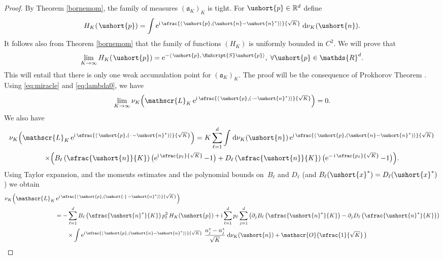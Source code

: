 \documentclass[10pt]{amsart}
\newcommand{\scaleto}[2]{#1}
\let\mathcal\mathscr
\numberwithin{equation}{section}
\theoremstyle{plain}
\theoremstyle{definition}
\newcommand{\real}{\mathbb{R}}
\newcommand{\sK}{K}
\newcommand{\gen}{\mathscr{L}_{\sK}}
\newcommand{\vecn}{\ushort{n}}
\newcommand{\vecnf}{\ushort{n}^*}
\newcommand{\svecnf}{\ushort{n}^*}
\newcommand{\vecxf}{\ushort{x}^*}
\newcommand{\vp}{\ushort{p}}
\newcommand{\nuk}{\nu_{K}}\let\snuk\nuk
\newcommand{\e}{\operatorname{e}}
\newcommand{\ii}{\operatorname{i}}
\newcommand{\dd}{\hspace{1pt}\mathrm{d}}
\begin{document}
\begin{proof}
By Theorem \ref{bornemom}, the family of measures $(\mathfrak{a}_{\sK})_{\sK}$ is tight.
For $\vp\in \real^d$ define
\[
H_{\sK}(\hspace{1pt}\vp)=\int \e^{\ii \sfrac{\langle\, \vp,(\vecn-\svecnf)\rangle}{\sqrt{K}}}\dd \nuk(\vecn).
\]
It follows also from Theorem \ref{bornemom} that the family of functions $(H_{\sK})$ is uniformly bounded in $C^{2}$.
We will prove that
\begin{equation}\label{pelouse}
\lim_{\sK\to\infty}H_{\sK}(\hspace{1pt}\vp)=\e^{-\langle\, \vp,\hspace{1pt}\EuScript{S}\vp\rangle},\;\forall \vp\in \mathds{R}^d.
\end{equation}
This will entail that there is only one weak accumulation point for $(\mathfrak{a}_{\sK})_{\sK}$.
The proof will be the consequence of Prokhorov Theorem \cite{patrick}.
Using \eqref{eq:miracle} and \eqref{eq:lambda0}, we have
\[
\lim_{\sK\to\infty}\nuk\!\left(\gen \e^{\ii\sfrac{\langle\, \vp,(\cdot-\svecnf)\rangle}{\sqrt{K}}}\right)=0.
\]
We also have
\begin{multline*}
\nuk\!\left(\gen \e^{\ii \sfrac{\langle\, \vp,(\cdot\,-\svecnf)\rangle}{\sqrt{K}}}\right)
=
K\sum_{\ell=1}^{d}\int\dd\nuk(\vecn)\e^{\ii\sfrac{\langle\, \vp,(\vecn-\svecnf)\rangle}{\sqrt{K}}} \\
\times \Bigl(B_{\ell}\left(\sfrac{\vecn}{K}\right) \bigl(\e^{\ii\sfrac{p_{\ell}}{\sqrt{K}}}-1 \bigr)
+ D_{\ell}\left(\sfrac{\vecn}{K}\right) \bigl(\e^{-\ii\sfrac{p_{\ell}}{\sqrt{K}}}-1 \bigr)\Bigr).
\end{multline*}
Using Taylor expansion, and the moments estimates and the polynomial bounds on~$B_{\ell}$ and $D_{\ell}$
(and $B_{\ell}(\vecxf)=D_{\ell}(\vecxf)$) we obtain
\begin{align*}
\nuk\Bigl(\gen& \e^{\ii\sfrac{\langle\, \vp,(\ushort{\cdot}\,-\svecnf)\rangle}{\sqrt{K}}}\Bigr)
\\
& =-\sum_{\ell=1}^{d}B_{\ell}\left(\sfrac{\vecnf}{K}\right) p_{\ell}^2\,H_{\sK}(\vp)+ \ii\sum_{\ell=1}^{d} p_{\ell}\sum_{j=1}^{d}
\left(\partial_{j}B_{\ell}\left(\sfrac{\vecnf}{K}\right)-\partial_{j}D_{\ell}\left(\sfrac{\vecnf}{K}\right)\right)\\
& \qquad \times \int \e^{\ii\sfrac{\langle\, \vp, (\vecn-\svecnf)\rangle}{\sqrt{K}}}\,
\frac{n_{j}^{\scaleto{*}{2.5pt}}-n_{j}^{\scaleto{*}{2.5pt}}}{\sqrt{K}}\, \dd\nuk(\vecn)
+\mathcal{O}\bigl(\sfrac{1}{\sqrt{K}}\,\bigr)\\

\end{align*}
\end{proof}
\end{document}
